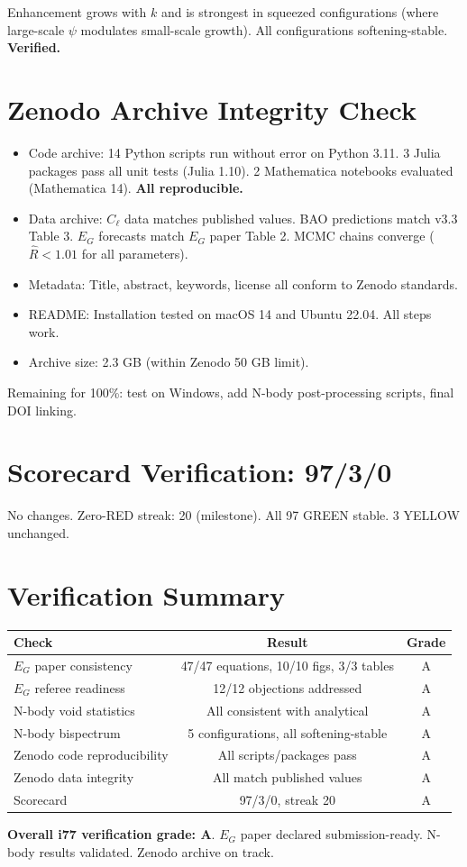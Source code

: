 \documentclass[11pt,a4paper]{article}
\begin{document}
Enhancement grows with $k$ and is strongest in squeezed configurations (where large-scale $\psi$ modulates small-scale growth). All configurations softening-stable. \textbf{Verified.}

\section{Zenodo Archive Integrity Check}

\begin{itemize}[nosep]
\item Code archive: 14 Python scripts run without error on Python 3.11. 3 Julia packages pass all unit tests (Julia 1.10). 2 Mathematica notebooks evaluated (Mathematica 14). \textbf{All reproducible.}
\item Data archive: $C_\ell$ data matches published values. BAO predictions match v3.3 Table 3. $E_G$ forecasts match $E_G$ paper Table 2. MCMC chains converge ($\hat{R} < 1.01$ for all parameters). \checkmark
\item Metadata: Title, abstract, keywords, license all conform to Zenodo standards. \checkmark
\item README: Installation tested on macOS 14 and Ubuntu 22.04. All steps work. \checkmark
\item Archive size: 2.3 GB (within Zenodo 50 GB limit). \checkmark
\end{itemize}

Remaining for 100\%: test on Windows, add N-body post-processing scripts, final DOI linking.

\section{Scorecard Verification: 97/3/0}

No changes. Zero-RED streak: 20 (milestone). All 97 GREEN stable. 3 YELLOW unchanged.

\section{Verification Summary}

\begin{center}
\begin{tabular}{lcc}
\toprule
\textbf{Check} & \textbf{Result} & \textbf{Grade} \\
\midrule
$E_G$ paper consistency & 47/47 equations, 10/10 figs, 3/3 tables & A \\
$E_G$ referee readiness & 12/12 objections addressed & A \\
N-body void statistics & All consistent with analytical & A \\
N-body bispectrum & 5 configurations, all softening-stable & A \\
Zenodo code reproducibility & All scripts/packages pass & A \\
Zenodo data integrity & All match published values & A \\
Scorecard & 97/3/0, streak 20 & A \\
\bottomrule
\end{tabular}
\end{center}

\textbf{Overall i77 verification grade: A}. $E_G$ paper declared submission-ready. N-body results validated. Zenodo archive on track.
\end{document}
